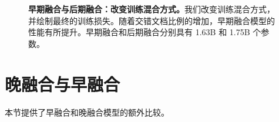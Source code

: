 \begin{table}[htb]
    \centering
    \setlength{\tabcolsep}{16pt}
    \renewcommand{\arraystretch}{1}
    \caption{\textbf{视觉编码器缩放器。} 当从头开始训练后融合模型时，降低视觉编码器的学习率效果更好。}
    \label{tab:late_scaler_scratch}
\end{table}



\begin{figure}[htp]
    \centering
    \captionsetup{type=figure}
    \begin{subfigure}[t]{0.33\linewidth}
        
    \end{subfigure}
    \begin{subfigure}[t]{0.32\linewidth}
         
    \end{subfigure}
    \begin{subfigure}[t]{0.32\linewidth}
         
    \end{subfigure}

    \vspace{0.3cm}
    \caption{\textbf{早期融合与后期融合：改变训练混合方式。}我们改变训练混合方式，并绘制最终的训练损失。随着交错文档比例的增加，早期融合模型的性能有所提升。早期融合和后期融合分别具有 1.63B 和 1.75B 个参数。}
    \label{fig:early_vs_late_datatype_sameflops}
\end{figure}
\section{晚融合与早融合}
\label{app:late_vs_early}
本节提供了早融合和晚融合模型的额外比较。

